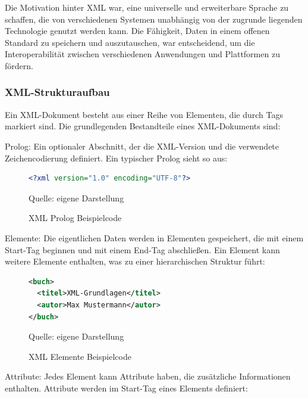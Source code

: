 Die Motivation hinter XML war, eine universelle und erweiterbare Sprache zu schaffen, die von verschiedenen Systemen
unabhängig von der zugrunde liegenden Technologie genutzt werden kann.
Die Fähigkeit, Daten in einem offenen Standard zu speichern und auszutauschen, war entscheidend,
um die Interoperabilität zwischen verschiedenen Anwendungen und Plattformen zu fördern.

\subsubsection{XML-Strukturaufbau}

Ein XML-Dokument besteht aus einer Reihe von Elementen, die durch Tags markiert sind.
Die grundlegenden Bestandteile eines XML-Dokuments sind:

Prolog: Ein optionaler Abschnitt, der die XML-Version und die verwendete Zeichencodierung definiert.
Ein typischer Prolog sieht so aus:

\begin{figure}[H]
\centering
\begin{minipage}{0.95\textwidth}
\begin{lstlisting}[language=XML]
<?xml version="1.0" encoding="UTF-8"?>
\end{lstlisting}
\end{minipage}
\caption{XML Prolog Beispielcode}
\label{fig:XML Prolog Beispielcode}
    {Quelle: eigene Darstellung}
\end{figure}

Elemente: Die eigentlichen Daten werden in Elementen gespeichert, die mit einem Start-Tag beginnen und mit einem End-Tag abschließen.
Ein Element kann weitere Elemente enthalten, was zu einer hierarchischen Struktur führt:

\begin{figure}[H]
\centering
\begin{minipage}{0.95\textwidth}
\begin{lstlisting}[language=XML]
<buch>
  <titel>XML-Grundlagen</titel>
  <autor>Max Mustermann</autor>
</buch>
\end{lstlisting}
\end{minipage}
\caption{XML Elemente Beispielcode}
\label{fig:XML Elemente Beispielcode}
    {Quelle: eigene Darstellung}
\end{figure}

Attribute: Jedes Element kann Attribute haben, die zusätzliche Informationen enthalten.
Attribute werden im Start-Tag eines Elements definiert:

